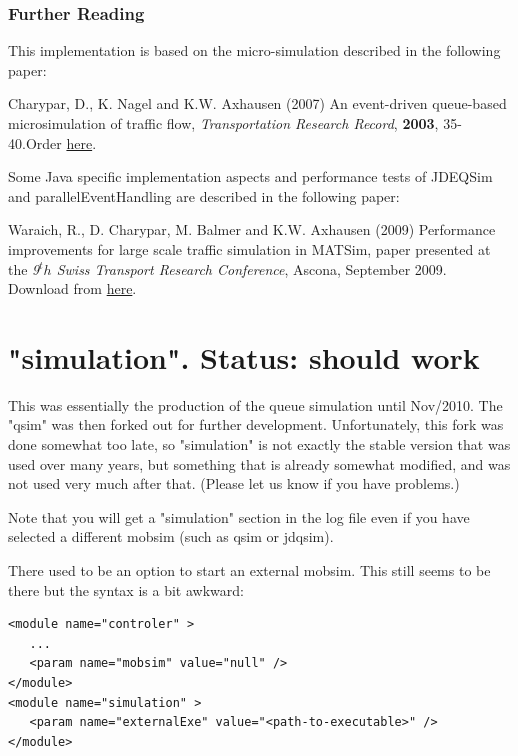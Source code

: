 \subsubsection{Further Reading}

This implementation is based on the micro-simulation described in the following paper:

Charypar, D., K. Nagel and K.W. Axhausen (2007) An event-driven queue-based microsimulation of traffic flow, \emph{Transportation Research Record}, \textbf{2003}, 35-40.Order \href{http://trb.metapress.com/content/j2118065485r4611/?p=4f63e25a261d48d99eeebea19b494e24&amp;pi=0}{here}.

Some  Java specific implementation aspects and performance tests of JDEQSim  and parallelEventHandling are described in the following paper:

Waraich,  R., D. Charypar, M. Balmer and K.W. Axhausen (2009) Performance  improvements for large scale traffic simulation in MATSim, paper  presented at the \emph{9$^th$ Swiss Transport Research Conference}, Ascona, September 2009. Download from \href{http://www.ivt.ethz.ch/vpl/publications/reports/ab565.pdf}{here}.

\vfill\eject
\section{"simulation". Status: should work}

This  was essentially the production of the queue simulation until Nov/2010.  The "qsim" was then forked out for further development. Unfortunately,  this fork was done somewhat too late, so "simulation" is not exactly the  stable version that was used over many years, but something that is  already somewhat modified, and was not used very much after that.  (Please let us know if you have problems.)

Note that you will get a "simulation" section in the log file even if  you have selected a different mobsim (such as qsim or jdqsim).

There used to be an option to start an external mobsim. This still seems to be there but the syntax is a bit awkward:
\begin{lstlisting}
<module name="controler" >
   ...
   <param name="mobsim" value="null" />
</module>
<module name="simulation" >
   <param name="externalExe" value="<path-to-executable>" />
</module>


\end{lstlisting}

